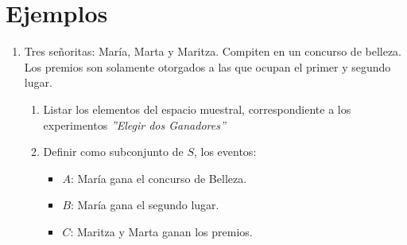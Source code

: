 \section{Ejemplos}
\begin{enumerate}
\item Tres señoritas: María, Marta y Maritza. Compiten en un concurso de belleza. Los premios son solamente otorgados a las que ocupan el primer y segundo lugar.
\begin{enumerate}
\item Listar los elementos del espacio muestral, correspondiente a los experimentos \textit{''Elegir dos Ganadores''}
\item Definir como subconjunto de $S$, los eventos:
\begin{itemize}
\item $A$: María gana el concurso de Belleza.
\item $B$: María gana el segundo lugar.
\item $C$: Maritza y Marta ganan los premios.
\end{itemize}
\end{enumerate}

\end{enumerate}
